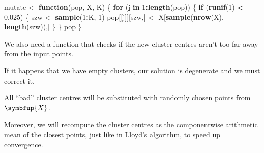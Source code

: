 \documentclass[10pt,b5paper,krantz1]{krantz}
\newenvironment{Shaded}{\begin{snugshade}}{\end{snugshade}}
\newcommand{\ControlFlowTok}[1]{\textcolor[rgb]{0.27,0.27,0.27}{\textbf{#1}}}
\newcommand{\DecValTok}[1]{\textcolor[rgb]{0.06,0.06,0.06}{#1}}
\newcommand{\FloatTok}[1]{\textcolor[rgb]{0.06,0.06,0.06}{#1}}
\newcommand{\KeywordTok}[1]{\textcolor[rgb]{0.27,0.27,0.27}{\textbf{#1}}}
\newcommand{\NormalTok}[1]{#1}
\newcommand{\OperatorTok}[1]{\textcolor[rgb]{0.43,0.43,0.43}{\textbf{#1}}}
\newcommand{\StringTok}[1]{\textcolor[rgb]{0.5,0.5,0.5}{#1}}
\renewcommand{\mathbf}[1]{\symbfup{#1}}
\begin{document}
\begin{Shaded}
\begin{Highlighting}[]
\NormalTok{mutate <-}\StringTok{ }\ControlFlowTok{function}\NormalTok{(pop, X, K) \{}
    \ControlFlowTok{for}\NormalTok{ (j }\ControlFlowTok{in} \DecValTok{1}\OperatorTok{:}\KeywordTok{length}\NormalTok{(pop)) \{}
       \ControlFlowTok{if}\NormalTok{ (}\KeywordTok{runif}\NormalTok{(}\DecValTok{1}\NormalTok{) }\OperatorTok{<}\StringTok{ }\FloatTok{0.025}\NormalTok{) \{}
\NormalTok{          szw <-}\StringTok{ }\KeywordTok{sample}\NormalTok{(}\DecValTok{1}\OperatorTok{:}\NormalTok{K, }\DecValTok{1}\NormalTok{)}
\NormalTok{          pop[[j]][szw,] <-}\StringTok{ }\NormalTok{X[}\KeywordTok{sample}\NormalTok{(}\KeywordTok{nrow}\NormalTok{(X), }\KeywordTok{length}\NormalTok{(szw)),]}
\NormalTok{       \}}
\NormalTok{    \}}
\NormalTok{    pop}
\NormalTok{\}}
\end{Highlighting}
\end{Shaded}

We also need a function that checks if
the new cluster centres aren't too far away from the input points.

If it happens that we have empty clusters, our solution is degenerate and
we must correct it.

All ``bad'' cluster centres will be substituted with randomly chosen points from \(\mathbf{X}\).

Moreover, we will recompute the cluster centres as the componentwise arithmetic mean
of the closest points, just like in Lloyd's algorithm, to speed up convergence.
\end{document}
